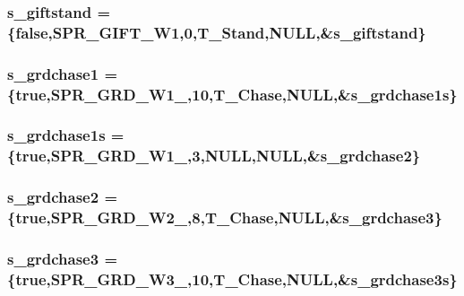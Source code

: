 \label{WL__ACT2_8C_a5014213e30afa37b5bfd50bbd77a2a38}
\hypertarget{WL__ACT2_8C_a8dcf4c30942fc3904126b1468012d9ed}{
\subsubsection[{s\_\-giftstand}]{ {\bf s\_\-giftstand} = \{false,SPR\_\-GIFT\_\-W1,0,T\_\-Stand,NULL,\&{\bf s\_\-giftstand}\}}}
\label{WL__ACT2_8C_a8dcf4c30942fc3904126b1468012d9ed}
\hypertarget{WL__ACT2_8C_a1d9f3438111fc0b2e57f2c72d5e8aa42}{
\subsubsection[{s\_\-grdchase1}]{ {\bf s\_\-grdchase1} = \{true,SPR\_\-GRD\_\-W1\_,10,T\_\-Chase,NULL,\&{\bf s\_\-grdchase1s}\}}}
\label{WL__ACT2_8C_a1d9f3438111fc0b2e57f2c72d5e8aa42}
\hypertarget{WL__ACT2_8C_a2e312b10f1b805aab5351e70fb446b75}{
\subsubsection[{s\_\-grdchase1s}]{ {\bf s\_\-grdchase1s} = \{true,SPR\_\-GRD\_\-W1\_,3,NULL,NULL,\&{\bf s\_\-grdchase2}\}}}
\label{WL__ACT2_8C_a2e312b10f1b805aab5351e70fb446b75}
\hypertarget{WL__ACT2_8C_a55ddfc7f10c016af1aa2478e9bb8dad8}{
\subsubsection[{s\_\-grdchase2}]{ {\bf s\_\-grdchase2} = \{true,SPR\_\-GRD\_\-W2\_,8,T\_\-Chase,NULL,\&{\bf s\_\-grdchase3}\}}}
\label{WL__ACT2_8C_a55ddfc7f10c016af1aa2478e9bb8dad8}
\hypertarget{WL__ACT2_8C_a8bc87beffeb977a5c95f49302ac14a72}{
\subsubsection[{s\_\-grdchase3}]{ {\bf s\_\-grdchase3} = \{true,SPR\_\-GRD\_\-W3\_,10,T\_\-Chase,NULL,\&{\bf s\_\-grdchase3s}\}}}
